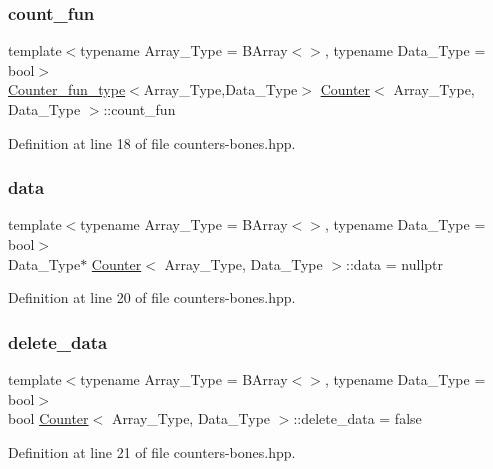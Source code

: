 \subsubsection{\texorpdfstring{count\+\_\+fun}{count\_fun}}
{\footnotesize\ttfamily template$<$typename Array\+\_\+\+Type = B\+Array$<$$>$, typename Data\+\_\+\+Type = bool$>$ \\
\hyperlink{typedefs_8hpp_ac0160f52f564dea3ac033b374cffbfe7}{Counter\+\_\+fun\+\_\+type}$<$Array\+\_\+\+Type,Data\+\_\+\+Type$>$ \hyperlink{class_counter}{Counter}$<$ Array\+\_\+\+Type, Data\+\_\+\+Type $>$\+::count\+\_\+fun}



Definition at line 18 of file counters-\/bones.\+hpp.

\mbox{\label{class_counter_a9ebfed99a67888f80c19cabc4098bdd0}} 
\subsubsection{\texorpdfstring{data}{data}}
{\footnotesize\ttfamily template$<$typename Array\+\_\+\+Type = B\+Array$<$$>$, typename Data\+\_\+\+Type = bool$>$ \\
Data\+\_\+\+Type$\ast$ \hyperlink{class_counter}{Counter}$<$ Array\+\_\+\+Type, Data\+\_\+\+Type $>$\+::data = nullptr}



Definition at line 20 of file counters-\/bones.\+hpp.

\mbox{\label{class_counter_a5190fbe81aac2426ac36c0a088e242e7}} 
\subsubsection{\texorpdfstring{delete\+\_\+data}{delete\_data}}
{\footnotesize\ttfamily template$<$typename Array\+\_\+\+Type = B\+Array$<$$>$, typename Data\+\_\+\+Type = bool$>$ \\
bool \hyperlink{class_counter}{Counter}$<$ Array\+\_\+\+Type, Data\+\_\+\+Type $>$\+::delete\+\_\+data = false}



Definition at line 21 of file counters-\/bones.\+hpp.

\mbox{\label{class_counter_abb4e0b67e6489d438918495651baa5a8}} 
